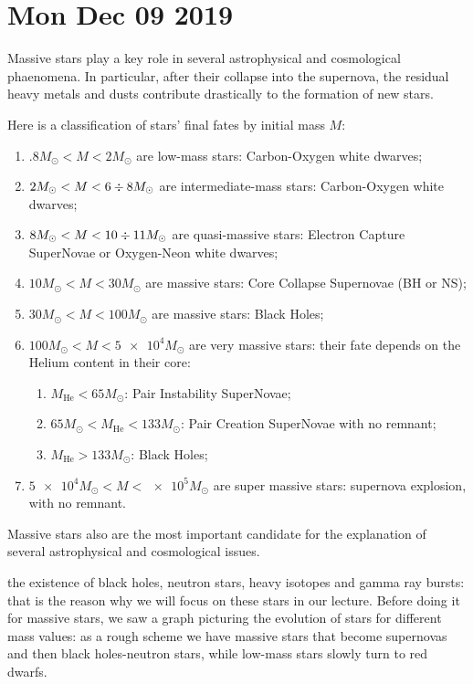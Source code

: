 \documentclass[main.tex]{subfiles}
\begin{document}
\section*{Mon Dec 09 2019}


Massive stars play a key role in several astrophysical and 
cosmological phaenomena.
In particular, after their collapse into the supernova, the residual heavy metals and dusts contribute drastically to the formation of new stars.

Here is a classification of stars' final fates by initial mass \(M\): 
\begin{enumerate}
    \item \(\num{.8} M_{\odot} < M < \num{2} M_{\odot}\) are low-mass stars: Carbon-Oxygen white dwarves;
    \item \(\num{2} M_{\odot} < M < 6 \divisionsymbol 8 M_{\odot}\) are intermediate-mass stars: Carbon-Oxygen white dwarves;
    \item \(\num{8} M_{\odot} < M < 10 \divisionsymbol 11 M_{\odot}\) are quasi-massive stars: Electron Capture SuperNovae or Oxygen-Neon white dwarves;
    \item \(10 M_{\odot} < M < 30 M_{\odot}\) are massive stars: Core Collapse Supernovae (BH or NS);
    \item \(30 M_{\odot} < M < 100 M_{\odot}\) are massive stars: Black Holes;
    \item \(100 M_{\odot} < M < \num{5e4} M_{\odot}\) are very massive stars: their fate depends on the Helium content in their core: \begin{enumerate}
        \item \(M _{\text{He}} < 65 M_{\odot}\): Pair Instability SuperNovae;
        \item \(65 M_{\odot} < M _{\text{He}} < 133 M_{\odot}\): Pair Creation SuperNovae with no remnant;
        \item \(M _{\text{He}} > 133 M_{\odot}\): Black Holes;
    \end{enumerate}
    \item \(\num{5e4} M_{\odot} < M < \num{e5} M_{\odot}\)  are super massive stars: supernova explosion, with no remnant.
\end{enumerate}


Massive stars also are the most important candidate for the explanation of several astrophysical and cosmological issues.

the existence of black holes, neutron stars, heavy isotopes and gamma ray bursts: that is the reason why we will focus on these stars in our lecture.
Before doing it for massive stars, we saw a graph picturing the evolution of stars for different mass values: as a rough scheme we have massive stars that become supernovas and then black holes-neutron stars, while low-mass stars slowly turn to red dwarfs.
\end{document}
